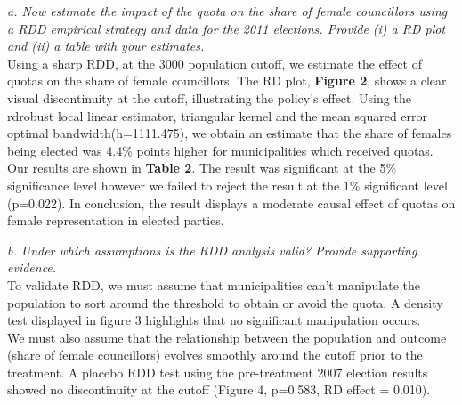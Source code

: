 \documentclass[12pt]{article}
\begin{document}
\textit{a. Now estimate the impact of the quota on the share of female councillors using a RDD empirical strategy and data for the 2011 elections. Provide (i) a RD plot and (ii) a table with your estimates. }\\

 Using a sharp RDD, at the 3000 population cutoff, we estimate the effect of quotas on the share of female councillors. The RD plot, \textbf{Figure 2}, shows a clear visual discontinuity at the cutoff, illustrating the policy's effect. Using the rdrobust local linear estimator, triangular kernel and the mean squared error optimal bandwidth(h=1111.475), we obtain an estimate that the share of females being elected was 4.4\% points higher for municipalities which received quotas. Our results are shown in \textbf{Table 2}. The result was significant at the 5\% significance level however we failed to reject the result at the 1\% significant level (p=0.022). In conclusion, the result displays a moderate causal effect of quotas on female representation in elected parties.

\begin{table}[H]
    \centering
    \caption{RDD estimates of quota effect on share of female councillors (2011)}
\end{table}

\noindent
\textit{b. Under which assumptions is the RDD analysis valid? Provide supporting evidence.} \\

To validate RDD, we must assume that municipalities can’t manipulate the population to sort around the threshold to obtain or avoid the quota. A density test displayed in figure 3 highlights that no significant manipulation occurs.\\

We must also assume that the relationship between the population and outcome (share of female councillors) evolves smoothly around the cutoff prior to the treatment. A placebo RDD test using the pre-treatment 2007 election results showed no discontinuity at the cutoff (Figure 4, p=0.583, RD effect = 0.010). \\
\end{document}
